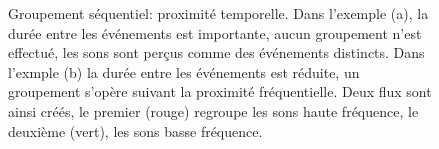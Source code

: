{\begin{figure}[t]
        \myfloatalign
        \caption[Groupement séquentiel : proximité temporelle.]{Groupement séquentiel: proximité temporelle. Dans l'exemple (a), la durée entre les événements est importante, aucun groupement n'est effectué, les sons sont perçus comme des événements distincts. Dans l'exmple (b) la durée entre les événements est réduite, un groupement s'opère suivant la proximité fréquentielle. Deux flux sont ainsi créés, le premier (rouge) regroupe les sons haute fréquence, le deuxième (vert), les sons basse fréquence.}\label{fig:tonesim}
\end{figure}

}
